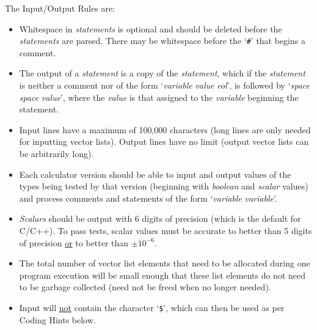 \documentclass[12pt]{article}
\begin{document}
The Input/Output Rules are:
\begin{indpar}{0.2in}\begin{itemize}

\item Whitespace in {\em statements} is optional and should be deleted
before the {\em statements} are parsed.  There may be whitespace
before the `{\tt \#}' that begins a comment.

\item The output of a {\em statement} is a copy of the {\em statement},
which if the {\em statement} is neither a comment nor of the form
`{\em variable} \TT{=} {\em value} {\em eol}', 
is followed by `{\em space} \TT{=} {\em space} {\em value}', where
the {\em value} is that assigned to the {\em variable} beginning the
statement.

\item Input lines have a maximum of 100,000 characters (long lines
are only needed for inputting vector lists).  Output lines have
no limit (output vector lists can be arbitrarily long).

\item Each calculator version should be able to input and output
values of the types being tested by that version (beginning with
{\em boolean} and {\em scalar} values) and process comments
and statements of the form `{\em variable} \TT{=} {\em variable}'.

\item {\em Scalars} should be output with 6 digits of precision
(which is the default for C/C++).  To pass tests, scalar values
must be accurate to better than 5 digits of precision \underline{or}
to better than $\pm 10^{-6}$.

\item  The total number of vector list elements that need to be
allocated during one program execution will be small enough
that these list elements do not need to be garbage collected
(need not be freed when no longer needed).

\item Input will \underline{not} contain the character `{\tt \$}',
which can then be used as per Coding Hints below.


\end{itemize}\end{indpar}

\newpage
\end{document}
